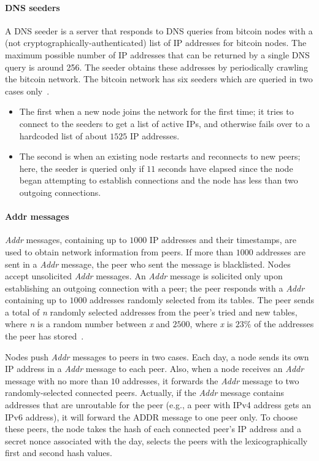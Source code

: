 \paragraph*{DNS seeders}
A DNS seeder is a server that responds to DNS queries from bitcoin nodes with a (not cryptographically-authenticated) list of IP addresses for bitcoin nodes. The maximum possible number of IP addresses that can be returned by a single DNS query is around 256. The seeder obtains these addresses by periodically crawling the bitcoin network. The bitcoin network has six seeders which are queried in two cases only~\cite{heilman2015eclipse}.
\begin{itemize}
  \item The first when a new node joins the network for the first time; it tries to connect to the seeders to get a list of active IPs, and otherwise fails over to a hardcoded list of about $1525$ IP addresses.
  \item The second is when an existing node restarts and reconnects to new peers; here, the seeder is queried only if $11$ seconds have elapsed since the node began attempting to establish connections and the node has less than two outgoing connections.
\end{itemize}

\paragraph*{Addr messages}
\textsl{Addr} messages, containing up to $1000$ IP addresses and their timestamps, are used to obtain network information from peers. If more than $1000$ addresses are sent in a \textsl{Addr} message, the peer who sent the message is blacklisted. Nodes accept unsolicited \textsl{Addr} messages. An \textsl{Addr} message is solicited only upon establishing an outgoing connection with a peer; the peer responds with a \textsl{Addr} containing up to $1000$ addresses randomly selected from its tables. The peer sends a total of \textsl{n} randomly selected addresses from the peer’s tried and new tables, where \textsl{n} is a random number between \textsl{x} and $2500$, where \textsl{x} is $23\%$ of the addresses the peer has stored~\cite{heilman2015eclipse}.

Nodes push \textsl{Addr} messages to peers in two cases. Each day, a node sends its own IP address in a \textsl{Addr} message to each peer. Also, when a node receives an \textsl{Addr} message with no more than $10$ addresses, it forwards the \textsl{Addr} message to two randomly-selected connected peers. Actually, if the \textsl{Addr} message contains addresses that are unroutable for the peer (e.g., a peer with IPv4 address gets an IPv6 address), it will forward the ADDR message to one peer only. To choose these peers, the node takes the hash of each connected peer’s IP address and a secret nonce associated with the day, selects the peers with the lexicographically first and second hash values.

